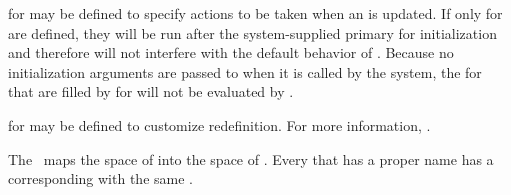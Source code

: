 \endsubsubsection%

             

 for  may be 
defined to specify actions to be taken when an  is updated.
If only  for  are
defined, they will be run after the system-supplied primary  for
initialization and therefore will not interfere with the default
behavior of .  Because no
initialization arguments are passed to 
when it is called by the system, the 
 for  
that are filled by  for  
will not be evaluated by .

 for  may be defined to customize
 redefinition.  For more information, \seesection\SharedInitialize.

\endsubsubsection%

%
% 
% 
% 
% 
% 
% 

                                              
The \CLOS\ maps the space of  into the space of .
Every  that has a proper name has a corresponding  
with the same .  

